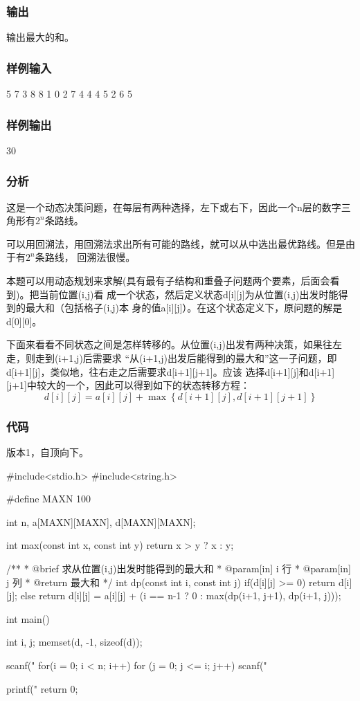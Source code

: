 \subsubsection{输出}
输出最大的和。

\subsubsection{样例输入}
\begin{Code}
5
7
3 8 
8 1 0  
2 7 4 4 
4 5 2 6 5
\end{Code}

\subsubsection{样例输出}
\begin{Code}
30
\end{Code}

\subsubsection{分析}
这是一个动态决策问题，在每层有两种选择，左下或右下，因此一个n层的数字三角形有$2^n$条路线。

可以用回溯法，用回溯法求出所有可能的路线，就可以从中选出最优路线。但是由于有$2^n$条路线，
回溯法很慢。

本题可以用动态规划来求解(具有最有子结构和重叠子问题两个要素，后面会看到)。把当前位置(i,j)看
成一个状态，然后定义状态d[i][j]为从位置(i,j)出发时能得到的最大和（包括格子(i,j)本
身的值a[i][j]）。在这个状态定义下，原问题的解是d[0][0]。

下面来看看不同状态之间是怎样转移的。从位置(i,j)出发有两种决策，如果往左走，则走到(i+1,j)后需要求
“从(i+1,j)出发后能得到的最大和”这一子问题，即d[i+1][j]，类似地，往右走之后需要求d[i+1][j+1]。应该
选择d[i+1][j]和d[i+1][j+1]中较大的一个，因此可以得到如下的状态转移方程：
$$d[i][j]=a[i][j]+\max\left\{d[i+1][j], d[i+1][j+1]\right\}$$

\subsubsection{代码}
版本1，自顶向下。

\begin{Codex}[label=numbers_triangle1.c]
#include<stdio.h>
#include<string.h>

#define MAXN 100

int n, a[MAXN][MAXN], d[MAXN][MAXN];

int max(const int x, const int y) {
    return x > y ? x : y;
}

/**
 * @brief 求从位置(i,j)出发时能得到的最大和
 * @param[in] i 行
 * @param[in] j 列
 * @return 最大和
 */
int dp(const int i, const int j) {
    if(d[i][j] >= 0) {
        return d[i][j];
    } else {
        return d[i][j] = a[i][j] + (i == n-1 ? 0 : max(dp(i+1, j+1), dp(i+1, j)));
    }
}

int main() {
    int i, j;
    memset(d, -1, sizeof(d));

    scanf("%
    for(i = 0; i < n; i++)
      for (j = 0; j <= i; j++) scanf("%
    
    printf("%
    return 0;
}
\end{Codex}

